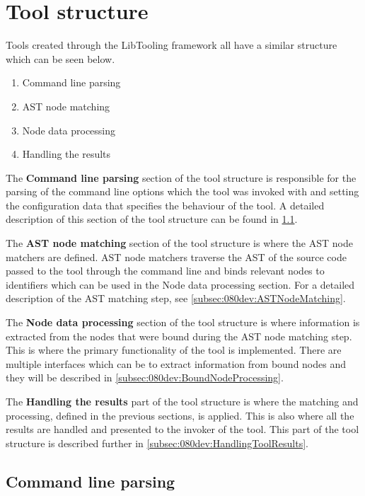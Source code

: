 \section{Tool structure} \label{sec:080dev:tool_structure}

Tools created through the LibTooling framework all have a similar structure which can be seen below.   

\begin{enumerate}
    \item Command line parsing
    \item AST node matching
    \item Node data processing
    \item Handling the results
\end{enumerate}

The \textbf{Command line parsing} section of the tool structure is responsible for the parsing of the command line options which the tool was invoked with and setting the configuration data that specifies the behaviour of the tool. A detailed description of this section of the tool structure can be found in \cref{subsec:080dev:CMDLineParsing}.

The \textbf{AST node matching} section of the tool structure is where the AST node matchers are defined. AST node matchers traverse the AST of the source code passed to the tool through the command line and binds relevant nodes to identifiers which can be used in the Node data processing section. For a detailed description of the AST matching step, see \cref{subsec:080dev:ASTNodeMatching}.

The \textbf{Node data processing} section of the tool structure is where information is extracted from the nodes that were bound during the AST node matching step. This is where the primary functionality of the tool is implemented. There are multiple interfaces which can be to extract information from bound nodes and they will be described in \cref{subsec:080dev:BoundNodeProcessing}.

The \textbf{Handling the results} part of the tool structure is where the matching and processing, defined in the previous sections, is applied. This is also where all the results are handled and presented to the invoker of the tool. This part of the tool structure is described further in \cref{subsec:080dev:HandlingToolResults}.


\subsection{Command line parsing} \label{subsec:080dev:CMDLineParsing}

